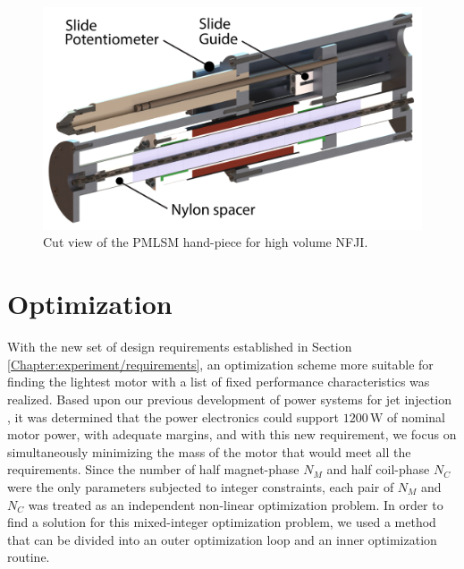     
    \begin{figure}[h]
        \centering
        \includegraphics[width=4.5in]{chap5/images_concept/full_cut_view_of_motor.pdf}
        \caption{Cut view of the PMLSM hand-piece for high volume NFJI.}
        \label{fig:chap/experiment/design concept/full_cut_view_of_motor}
    \end{figure}


\section{Optimization}                              \label{Chapter:experiment/optimization}


    With the new set of design requirements established in Section\,\ref{Chapter:experiment/requirements}, an optimization scheme more suitable for finding the lightest motor with a list of fixed performance characteristics was realized. Based upon our previous development of power systems for jet injection \cite{Ruddy2017}, it was determined that the power electronics could support $1200\,\mathrm{W}$ of nominal motor power, with adequate margins, and with this new requirement, we focus on simultaneously minimizing the mass of the motor that would meet all the requirements. Since the number of half magnet-phase $N_M$ and half coil-phase $N_C$ were the only parameters subjected to integer constraints, each pair of $N_M$ and $N_C$ was treated as an independent non-linear optimization problem. In order to find a solution for this mixed-integer optimization problem, we used a method that can be divided into an outer optimization loop and an inner optimization routine.
    
